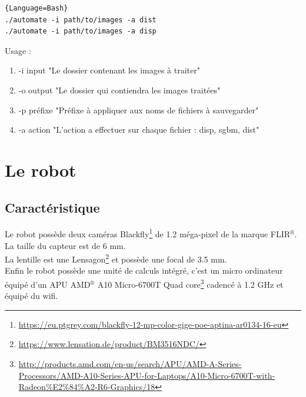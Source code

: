 \documentclass[12pt,a4paper]{report}
\begin{document}
\begin{lstlisting}{Language=Bash}
./automate -i path/to/images -a dist
./automate -i path/to/images -a disp
\end{lstlisting}

Usage :
\begin{enumerate}
\item[] -i input "Le dossier contenant les images à traiter"
\item[] -o output "Le dossier qui contiendra les images traitées"
\item[] -p préfixe "Préfixe à appliquer aux noms de fichiers à sauvegarder"
\item[] -a action "L'action a effectuer sur chaque fichier : disp, sgbm, dist"
\end{enumerate}

\chapter{Le robot}

\section{Caractéristique}
Le robot possède deux caméras Blackfly\footnote{\url{https://eu.ptgrey.com/blackfly-12-mp-color-gige-poe-aptina-ar0134-16-eu}} de 1.2 méga-pixel de la marque FLIR$^{\text{®}}$. La taille du capteur est de 6 mm.\\
La lentille est une Lensagon\footnote{\url{https://www.lensation.de/product/BM3516NDC/}} et possède une focal de 3.5 mm. 
\\Enfin le robot possède une unité de calculs intégré, c'est un micro ordinateur équipé d'un APU AMD$^{\text{®}}$ A10 Micro-6700T Quad core\footnote{\url{http://products.amd.com/en-us/search/APU/AMD-A-Series-Processors/AMD-A10-Series-APU-for-Laptops/A10-Micro-6700T-with-Radeon\%E2\%84\%A2-R6-Graphics/18}}  cadencé à 1.2 GHz et équipé du wifi.
\end{document}
